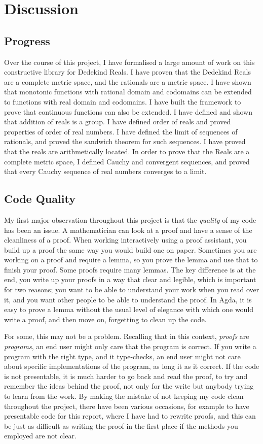 \documentclass[ProjectReport]{subfiles}
\begin{document}
\section{Discussion}

\subsection{Progress}
Over the course of this project, I have formalised a large amount of work on this constructive library for Dedekind Reals. I have proven that the Dedekind Reals are a complete metric space, and the rationals are a metric space. I have shown that monotonic functions with rational domain and codomains can be extended to functions with real domain and codomains. I have built the framework to prove that continuous functions can also be extended. I have defined and shown that addition of reals is a group. I have defined order of reals and proved properties of order of real numbers. I have defined the limit of sequences of rationals, and proved the sandwich theorem for such sequences. I have proved that the reals are arithmetically located. In order to prove that the Reals are a complete metric space, I defined Cauchy and convergent sequences, and proved that every Cauchy sequence of real numbers converges to a limit.

\subsection{Code Quality}
My first major observation throughout this project is that the \textit{quality} of my code has been an issue. A mathematician can look at a proof and have a sense of the cleanliness of a proof. When working interactively using a proof assistant, you build up a proof the same way you would build one on paper. Sometimes you are working on a proof and require a lemma, so you prove the lemma and use that to finish your proof. Some proofs require many lemmas. The key difference is at the end, you write up your proofs in a way that clear and legible, which is important for two reasons; you want to be able to understand your work when you read over it, and you want other people to be able to understand the proof. In Agda, it is easy to prove a lemma without the usual level of elegance with which one would write a proof, and then move on, forgetting to clean up the code.

For some, this may not be a problem. Recalling that in this context, \textit{proofs} are \textit{programs}, an end user might only care that the program is correct. If you write a program with the right type, and it type-checks, an end user might not care about specific implementations of the program, as long it as it correct. If the code is not presentable, it is much harder to go back and read the proof, to try and remember the ideas behind the proof, not only for the write but anybody trying to learn from the work. By making the mistake of not keeping my code clean throughout the project, there have been various occasions, for example to have presentable code for this report, where I have had to rewrite proofs, and this can be just as difficult as writing the proof in the first place if the methods you employed are not clear. 
\end{document}
